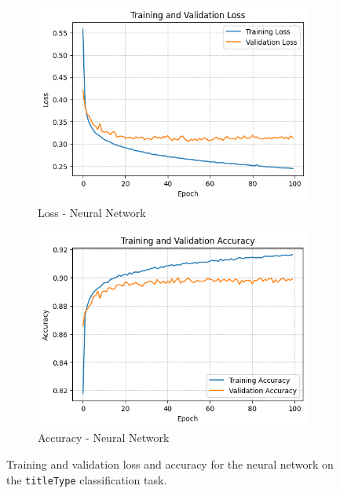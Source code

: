 
\begin{figure}
    \centering
    \begin{subfigure}[b]{0.48\textwidth}
        \centering
        \includegraphics[width=\textwidth]{plotsss/loss_titletype}
        \caption{Loss - Neural Network}
        \label{fig:loss_nn_titletype}
    \end{subfigure}
    \hfill
    \begin{subfigure}[b]{0.48\textwidth}
        \centering
        \includegraphics[width=\textwidth]{plotsss/accuracy_titletype.png}
        \caption{Accuracy - Neural Network}
        \label{fig:accuracy_nn_titletype}
    \end{subfigure}
    \caption{Training and validation loss and accuracy for the neural network on the \texttt{titleType} classification task.}
    \label{fig:nn_performance_titletype}
\end{figure}

